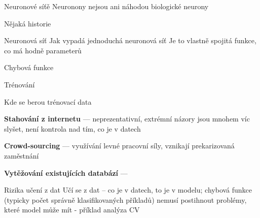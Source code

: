 \documentclass[aspectratio=169,dvipsnames]{beamer}
\begin{document}
\begin{frame}{Neuronové síťě}
Neuronony nejsou ani náhodou biologické neurony

Nějaká historie
\end{frame}

\begin{frame}{Neuronová síť}
Jak vypadá jednoduchá neuronová síť
Je to vlastně spojitá funkce, co má hodně parameterů
\end{frame}


\begin{frame}{Chybová funkce}
\end{frame}


\begin{frame}{Trénování}
\end{frame}


\begin{frame}{Kde se berou trénovací data}

    {\large\textbf{Stahování z internetu}} --- neprezentativní, extrémní názory
    jsou mnohem víc slyšet, není kontrola nad tím, co je v datech

    {\large\textbf{Crowd-sourcing}} --- využívání levné pracovní síly, vznikají
    prekarizovaná zaměstnání

    {\large\textbf{Vytěžování existujících databází}} --- 

\end{frame}


\begin{frame}{Rizika učení z dat}
Učí se z dat -- co je v datech, to je v modelu; chybová funkce (typicky počet správně klasifikovaných příkladů) nemusí postihnout problémy, které model může mít - příklad analýza CV

\end{frame}

\begin{frame}{}
\end{frame}

\end{document}
